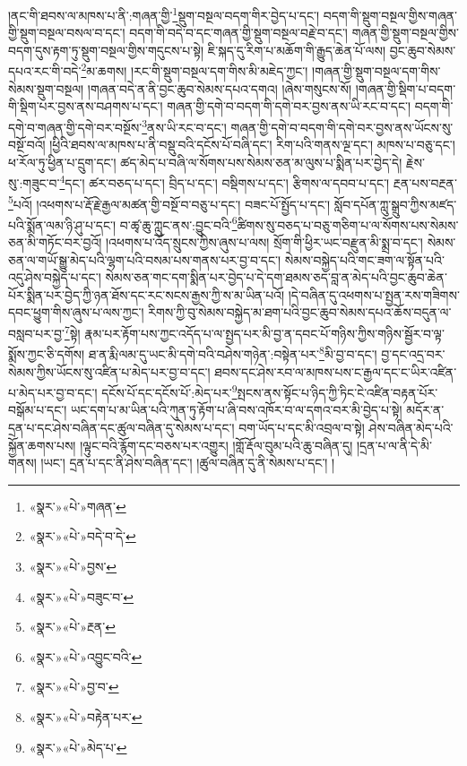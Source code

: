 །ནང་གི་ཐབས་ལ་མཁས་པ་ནི་:གཞན་གྱི་\footnote{«སྣར་»«པེ་»གཞན་}སྡུག་བསྔལ་བདག་གིར་བྱེད་པ་དང་། བདག་གི་སྡུག་བསྔལ་གྱིས་གཞན་གྱི་སྡུག་བསྔལ་བསལ་བ་དང་། བདག་གི་བདེ་བ་དང་གཞན་གྱི་སྡུག་བསྔལ་བརྗེ་བ་དང་། གཞན་གྱི་སྡུག་བསྔལ་གྱིས་བདག་དུས་རྟག་ཏུ་སྡུག་བསྔལ་གྱིས་གདུངས་པ་སྟེ། ཇི་སྐད་དུ་རིག་པ་མཆོག་གི་རྒྱུད་ཆེན་པོ་ལས། བྱང་ཆུབ་སེམས་དཔའ་རང་གི་བདེ་\footnote{«སྣར་»«པེ་»བདེ་བ་དེ་}མ་ཆགས། །རང་གི་སྡུག་བསྔལ་དག་གིས་མི་མཇེད་ཀྱང་། །གཞན་གྱི་སྡུག་བསྔལ་དག་གིས་སེམས་སྡུག་བསྔལ། །གཞན་བདེ་ན་ནི་བྱང་ཆུབ་སེམས་དཔའ་དགའ། །ཞེས་གསུངས་སོ། །གཞན་གྱི་སྡིག་པ་བདག་གི་སྡིག་པར་བྱས་ནས་བཤགས་པ་དང་། གཞན་གྱི་དགེ་བ་བདག་གི་དགེ་བར་བྱས་ནས་ཡི་རང་བ་དང་། བདག་གི་དགེ་བ་གཞན་གྱི་དགེ་བར་བསྔོས་\footnote{«སྣར་»«པེ་»བྱས་}ནས་ཡི་རང་བ་དང་། གཞན་གྱི་དགེ་བ་བདག་གི་དགེ་བར་བྱས་ནས་ཡོངས་སུ་བསྔོ་བའོ། །ཕྱིའི་ཐབས་ལ་མཁས་པ་ནི་བསྡུ་བའི་དངོས་པོ་བཞི་དང་། རིག་པའི་གནས་ལྔ་དང་། མཁས་པ་བཅུ་དང་། ཕ་རོལ་ཏུ་ཕྱིན་པ་དྲུག་དང་། ཚད་མེད་པ་བཞི་ལ་སོགས་པས་སེམས་ཅན་མ་ལུས་པ་སྨིན་པར་བྱེད་དེ། རྗེས་སུ་:གཟུང་བ་\footnote{«སྣར་»«པེ་»བཟུང་བ་}དང་། ཚར་བཅད་པ་དང་། བྲིད་པ་དང་། བསྡིགས་པ་དང་། རྩིགས་ལ་དབབ་པ་དང་། རྔན་པས་བརྔན་\footnote{«སྣར་»«པེ་»རྔན་}པའོ། །འཕགས་པ་རྡོ་རྗེ་རྒྱལ་མཚན་གྱི་བསྔོ་བ་བཅུ་པ་དང་། བཟང་པོ་སྤྱོད་པ་དང་། སློབ་དཔོན་ཀླུ་སྒྲུབ་ཀྱིས་མཛད་པའི་སྨོན་ལམ་ཉི་ཤུ་པ་དང་། བ་ཚྭ་ཆུ་ཀླུང་ནས་:བྱུང་བའི་\footnote{«སྣར་»«པེ་»འབྱུང་བའི་}ཚིགས་སུ་བཅད་པ་བཅུ་གཅིག་པ་ལ་སོགས་པས་སེམས་ཅན་མི་གཏོང་བར་བྱའོ། །འཕགས་པ་འོད་སྲུངས་ཀྱིས་ཞུས་པ་ལས། སྲོག་གི་ཕྱིར་ཡང་བརྫུན་མི་སྨྲ་བ་དང་། སེམས་ཅན་ལ་གཡོ་སྒྱུ་མེད་པའི་ལྷག་པའི་བསམ་པས་གནས་པར་བྱ་བ་དང་། སེམས་བསྐྱེད་པའི་གང་ཟག་ལ་སྟོན་པའི་འདུ་ཤེས་བསྐྱེད་པ་དང་། སེམས་ཅན་གང་དག་སྨིན་པར་བྱེད་པ་དེ་དག་ཐམས་ཅད་བླ་ན་མེད་པའི་བྱང་ཆུབ་ཆེན་པོར་སྨིན་པར་བྱེད་ཀྱི་ཉན་ཐོས་དང་རང་སངས་རྒྱས་ཀྱི་ས་མ་ཡིན་པའོ། །དེ་བཞིན་དུ་འཕགས་པ་སྤྱན་རས་གཟིགས་དབང་ཕྱུག་གིས་ཞུས་པ་ལས་ཀྱང་། རིགས་ཀྱི་བུ་སེམས་བསྐྱེད་མ་ཐག་པའི་བྱང་ཆུབ་སེམས་དཔའ་ཆོས་བདུན་ལ་བསླབ་པར་བྱ་\footnote{«སྣར་»«པེ་»བྱ་བ་}སྟེ། རྣམ་པར་རྟོག་པས་ཀྱང་འདོད་པ་ལ་སྤྱད་པར་མི་བྱ་ན་དབང་པོ་གཉིས་ཀྱིས་གཉིས་སྦྱོར་བ་ལྟ་སྨོས་ཀྱང་ཅི་དགོས། ཐ་ན་རྨི་ལམ་དུ་ཡང་མི་དགེ་བའི་བཤེས་གཉེན་:བསྟེན་པར་\footnote{«སྣར་»«པེ་»བརྟེན་པར་}མི་བྱ་བ་དང་། བྱ་དང་འདྲ་བར་སེམས་ཀྱིས་ཡོངས་སུ་འཛིན་པ་མེད་པར་བྱ་བ་དང་། ཐབས་དང་ཤེས་རབ་ལ་མཁས་པས་ང་རྒྱལ་དང་ང་ཡིར་འཛིན་པ་མེད་པར་བྱ་བ་དང་། དངོས་པོ་དང་དངོས་པོ་:མེད་པར་\footnote{«སྣར་»«པེ་»མེད་པ་}སྤངས་ནས་སྟོང་པ་ཉིད་ཀྱི་ཏིང་ངེ་འཛིན་བརྟན་པོར་བསྒོམ་པ་དང་། ཡང་དག་པ་མ་ཡིན་པའི་ཀུན་ཏུ་རྟོག་པ་ཞི་བས་འཁོར་བ་ལ་དགའ་བར་མི་བྱེད་པ་སྟེ། མདོར་ན་དྲན་པ་དང་ཤེས་བཞིན་དང་ཚུལ་བཞིན་དུ་སེམས་པ་དང་། བག་ཡོད་པ་དང་མི་འབྲལ་བ་སྟེ། ཤེས་བཞིན་མེད་པའི་སྐྱོན་ཆགས་པས། །ལྟུང་བའི་རྙོག་དང་བཅས་པར་འགྱུར། །གློ་རྡོལ་བུམ་པའི་ཆུ་བཞིན་དུ། །དྲན་པ་ལ་ནི་དེ་མི་གནས། །ཡང་། དྲན་པ་དང་ནི་ཤེས་བཞིན་དང་། །ཚུལ་བཞིན་དུ་ནི་སེམས་པ་དང་། །
